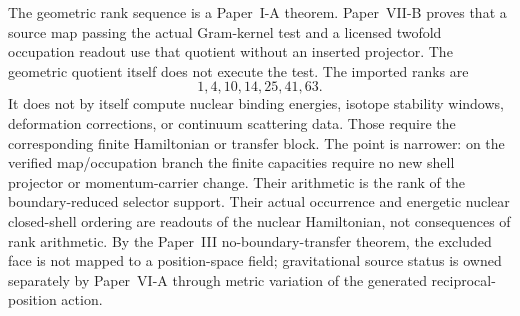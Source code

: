 \documentclass[12pt,a4paper]{article}
\begin{document}
\begin{remark}
\label{p11:rem:boundary-reduced-shell-count-status}
The geometric rank sequence is a Paper~I-A theorem.  Paper~VII-B proves that a source map passing the actual Gram-kernel test
and a licensed twofold occupation readout use that quotient without an
inserted projector. The geometric quotient itself does not execute the test.  The imported ranks are
\[
        1,4,10,14,25,41,63.
\]
It does not by itself compute nuclear binding energies, isotope stability windows, deformation corrections, or continuum scattering data.  Those require the corresponding finite Hamiltonian or transfer block.  The point is narrower: on the verified map/occupation branch the finite
capacities require no new shell projector or momentum-carrier change.
Their arithmetic is the rank of the boundary-reduced selector support.
Their actual occurrence and energetic nuclear closed-shell ordering are
readouts of the nuclear Hamiltonian, not consequences of rank arithmetic.  By the Paper~III no-boundary-transfer theorem, the excluded face is not mapped to a position-space field; gravitational source status is owned separately by Paper~VI-A through metric variation of the generated reciprocal-position action.
\end{remark}



\end{document}
